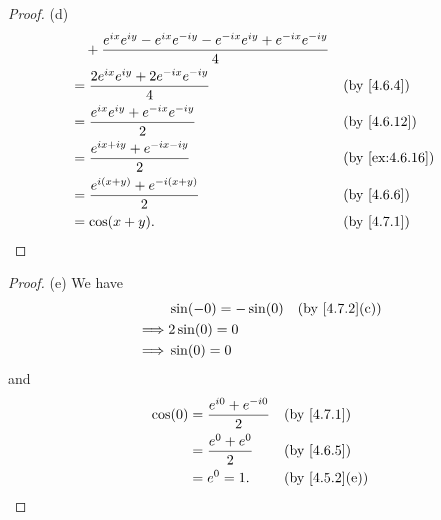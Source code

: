\begin{proof}{(d)}
\begin{align*}
     & \quad + \dfrac{e^{i x} e^{i y} - e^{i x} e^{- i y} - e^{- i x} e^{i y} + e^{- i x} e^{- i y}}{4}                                                                    \\
     & = \dfrac{2 e^{i x} e^{i y} + 2 e^{- i x} e^{- i y}}{4}                                                                            &  & \text{(by \cref{4.6.4})}     \\
     & = \dfrac{e^{i x} e^{i y} + e^{- i x} e^{- i y}}{2}                                                                                &  & \text{(by \cref{4.6.12})}    \\
     & = \dfrac{e^{i x + i y} + e^{- i x - i y}}{2}                                                                                      &  & \text{(by \cref{ex:4.6.16})} \\
     & = \dfrac{e^{i (x + y)} + e^{- i (x + y)}}{2}                                                                                      &  & \text{(by \cref{4.6.6})}     \\
     & = \cos(x + y).                                                                                                                    &  & \text{(by \cref{4.7.1})}
  \end{align*}
\end{proof}

\begin{proof}{(e)}
  We have
  \begin{align*}
             & \sin(-0) = -\sin(0) &  & \text{(by \cref{4.7.2}(c))} \\
    \implies & 2 \sin(0) = 0                                        \\
    \implies & \sin(0) = 0
  \end{align*}
  and
  \begin{align*}
    \cos(0) & = \dfrac{e^{i 0} + e^{- i 0}}{2} &  & \text{(by \cref{4.7.1})}    \\
            & = \dfrac{e^{0} + e^{0}}{2}       &  & \text{(by \cref{4.6.5})}    \\
            & = e^0 = 1.                       &  & \text{(by \cref{4.5.2}(e))}
  \end{align*}
\end{proof}

